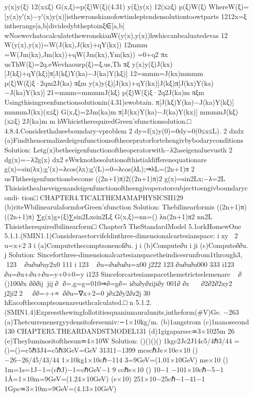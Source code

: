 {{{{{{{{{y(x)y(ξ)
12(x≤ξ)
G(x,ξ)=p(ξ)W(ξ)(4.31)
y(ξ)y(x)
12(x≥ξ)
p(ξ)W(ξ)
WhereW(ξ)=[y(x)y′(x)−y′(x)y(x)]isthewronskianofowtindeptendensolutiontoowtparts
1212x=ξ
intherange[a,b]dividedybtheptoinξ∈[a,b]
wNoewevhatocalculatethewronskianW(y(x),y(x))hwhiccanbealuatedevas
12
W(y(x),y(x))=W(J(kx),J(kx)+qY(kx))
12mmm
=W(Jm(kx),Jm(kx))+qW(Jm(kx),Ym(kx))
=0+q2
πx
usThW(ξ)=2q.eWevhaourp(ξ)=ξ.us,Th
πξ
y(x)y(ξ)J(kx)[J(kξ)+qY(kξ)]π[J(kξ)Y(ka)−J(ka)Y(kξ)]
12=mmm=J(kx)mmmm
p(ξ)W(ξ)ξ·2qm2J(ka)
πξm
y(x)y(ξ)[J(kx)+qY(kx)]J(kξ)π[J(kx)Y(ka)−J(ka)Y(kx)]
21=mmm=mmmmJ(kξ)
p(ξ)W(ξ)ξ·2q2J(ka)m
πξm
Usingthisingreenfunctionsolutionin(4.31)ewobtain.
{π[J(kξ)Y(ka)−J(ka)Y(kξ)]
mmmmJ(kx)(x≤ξ)
G(x,ξ)=2Jm(ka)m
π[J(kx)Y(ka)−J(ka)Y(kx)]
mmmmJ(kξ)(x≥ξ)
2J(ka)m
m
hWhicistherequiredGreen’sfunctionsolution.□
4.8.4.Considerthalueeboundary-vproblem
2
dy=f(x)y(0)=0dy=0(0≤x≤L).
2
dxdx
(a)Findthenormalizedeigenfunctionsoftheoepratorfortehengivbybodaryconditions
Solution:
Letg(x)betheeigenfunctionoftheoperatorwith−λ2aseigenaluevusth
2
dg(x)=−λ2g(x)
dx2
eWwknothesolutionofthistialdifferenequationare
g(x)=sin(λx);g′(x)=λcos(λx);g′(L)=0=λcos(λL);⇒λL=(2n+1)π
2
usThtheeigenfunctionsbecome
((2n+1)π)2((2n+1)π)2
g(x)=sin2Lx;−λ=2L
Thisisisthealueveigenandeigenfunctionoftheengivoperatorsubjecttoengivboundarycondi-
tion□
CHAPTER4.TICALTHEMAMAPHYSICSII129
(b)riteWbilinearulaformforGreen’sfunction
Solution:
Thebilinearformis
((2n+1)π)((2n+1)π)
∑g(x)g∗(ξ)∑sin2Lxsin2Lξ
G(x,ξ)=nn=()
λn(2n+1)π2
nn2L
Thisistherequiredbilinearform□
Chapter5
TheStandardModel
5.1orkHomewOne
5.1.1.(SMIN1.1)Consideraectorvifeldinthree-dimensionalcartesianspace:
ixy
2
u=x+2
3
i
(a)Computethecomptsonenof∂u.
j
i
(b)Compute∂u
i
ji
(c)Compute∂∂u.
j
Solution:
Sinceforthree-dimensionalcartesianspacetheindicesrunfrom1through3,
123
∂u∂u∂uy2x0
111
i123
∂u=∂u∂u∂u=x00
j222
123
∂u∂u∂u000
333
i123
∂u=∂u+∂u+∂u=y+0+0=y
i123
Sinceforcartesianspacethemetrictselemenare
∂
()100∂x
∂∂∂ijjij∂
∂=,g=g=010⇒∂=g∂=
i∂x∂y∂ziji∂y
001∂
∂z

∂2∂2∂2xy2
j2ji22
⇒∂∂=++≡∇⇒∂∂u=∇x+2=0
j∂x2∂y2∂z2j
30
hEacofthecomptsonenareusthcalculated.□
n
5.1.2.(SMIN1.4)Expressthewingfollotitiesquaninnauralunits,intheform(#V)Ge.
−263
(a)Thetcurrenenergyydensitoferseuniv:∼1×10kg/m.
(b)1angstrom
(c)1nanosecond
130
CHAPTER5.THEARDANDSTMODEL131
(d)1gigaparsec≃3×1025m
26
(e)Theyluminositofthesun≃4×10W
Solution:
()()()()
1kgc2Jc2J14c5/4ℏ3/44
=()=()=c5ℏ3J4=c5ℏ3GeV=GeV
31311−1399
mcscℏJe×10e×10
()
−26−26/45/43/44
1×10kg1×10cℏ−114
3=9GeV=(1.01×10GeV)
me×10
()
1m=1s=1J−1=(cℏJ)−1=cℏGeV−1
9
ccℏe×10
()
10−1
−101×10cℏ−5−1
1Å=1×10m=9GeV=(1.24×10GeV)
(e×10)
251×10−25cℏ−1−41−1
1Gpc≃3×10m=9GeV=(4.13×10GeV)
}}}}}}}}}}
